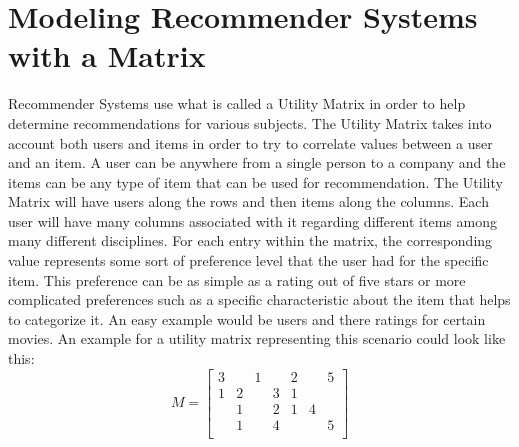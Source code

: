 \documentclass[11pt,reqno]{amsart}
\theoremstyle{definition}
\numberwithin{equation}{subsection}
\newcommand\tab[1][1cm]{\hspace*{#1}}
\begin{document}
\section{Modeling Recommender Systems with a Matrix}
\tab Recommender Systems use what is called a Utility Matrix in order to help determine recommendations for various subjects. The Utility Matrix takes into account both users and items in order to try to correlate values between a user and an item. A user can be anywhere from a single person to a company and the items can be any type of item that can be used for recommendation. The Utility Matrix will have users along the rows and then items along the columns. Each user will have many columns associated with it regarding different items among many different disciplines. For each entry within the matrix, the corresponding value represents some sort of preference level that the user had for the specific item. This preference can be as simple as a rating out of five stars or more complicated preferences such as a specific characteristic about the item that helps to categorize it. An easy example would be users and there ratings for certain movies. An example for a utility matrix representing this scenario could look like this:
\newline
\[
M=
  \begin{bmatrix}
    3 &  & 1 &  & 2 & & 5 \\
    1 & 2 & & 3 & 1 & &\\
    & 1 & & 2 & 1 & 4 &\\
     & 1 &  & 4 &  & & 5 \\
  \end{bmatrix}
\]
\newline
\end{document}
